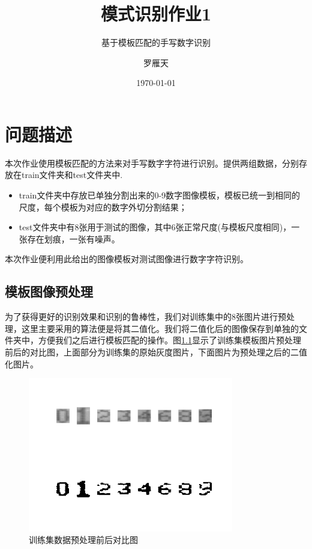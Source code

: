 \documentclass[cn]{elegantbook}
\title{模式识别作业1}
\subtitle{基于模板匹配的手写数字识别}
\author{罗雁天}
\institute{清华大学电子系}
\date{\today}
\begin{document}
\maketitle
\tableofcontents
\mainmatter
\hypersetup{pageanchor=true}
\chapter{问题描述}
本次作业使用模板匹配的方法来对手写数字字符进行识别。提供两组数据，分别存放在train文件夹和test文件夹中.
\begin{itemize}
	\item train文件夹中存放已单独分割出来的0-9数字图像模板，模板已统一到相同的尺度，每个模板为对应的数字外切分割结果；
	\item test文件夹中有8张用于测试的图像，其中6张正常尺度(与模板尺度相同)，一张存在划痕，一张有噪声。
\end{itemize}

本次作业便利用此给出的图像模板对测试图像进行数字字符识别。
\section{模板图像预处理}
为了获得更好的识别效果和识别的鲁棒性，我们对训练集中的8张图片进行预处理，这里主要采用的算法便是将其二值化。我们将二值化后的图像保存到单独的文件夹中，方便我们之后进行模板匹配的操作。图\ref{res1}显示了训练集模板图片预处理前后的对比图，上面部分为训练集的原始灰度图片，下面图片为预处理之后的二值化图片。

\begin{figure}[!h]
	\centering
	\includegraphics[width=0.8\textwidth]{res1}
	\caption{\label{res1}训练集数据预处理前后对比图}
\end{figure}
\end{document}
